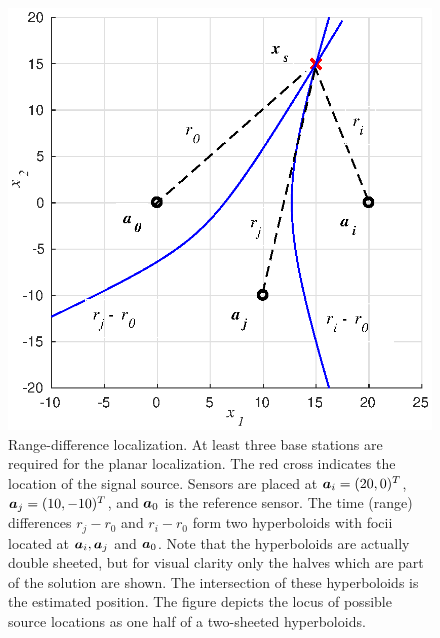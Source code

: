 \begin{figure}[h]
\centering
\includegraphics{figures/socp_rd/TDOA_example}
\caption{Range-difference localization.  At least three base stations are required for the planar localization. The red cross indicates the location of the signal source. Sensors are placed at $\protect\mbox{\boldmath$a$}_i = (20, 0)^T$, $\protect\mbox{\boldmath$a$}_j = (10, -10)^T$, and  $\protect\mbox{\boldmath$a$}_0$ is the reference sensor. The time (range) differences $r_j - r_0$ and $r_i - r_0$ form two hyperboloids with focii located at $\protect\mbox{\boldmath$a$}_i, \protect\mbox{\boldmath$a$}_j$ and $\protect\mbox{\boldmath$a$}_0$. Note that the hyperboloids are actually double sheeted, but for visual clarity only the halves which are part of the solution are shown. The intersection of these hyperboloids is the estimated position.
The figure depicts the locus of possible source locations as one half of a two-sheeted hyperboloids.}
\label{fig:tdoa}
\end{figure}
%
